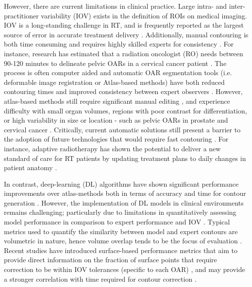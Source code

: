 However, there are current limitations in clinical practice. Large intra- and inter-practitioner variability (IOV) exists in the definition of ROIs on medical imaging. IOV is a long-standing challenge in RT, and is frequently reported as the largest source of error in accurate treatment delivery \cite{Vinod_2016}.
Additionally, manual contouring is both time consuming and requires highly skilled experts for consistency \cite{Nikolov_2018}. For instance, research has estimated that a radiation oncologist (RO) needs between 90-120 minutes to delineate pelvic OARs in a cervical cancer patient \cite{Liu_2020}. The process is often computer aided and automatic OAR segmentation tools (i.e. deformable image registration or Atlas-based methods) have both reduced contouring times and improved consistency between expert observers \cite{Vinod_2016}. However, atlas-based methods still require significant manual editing \cite{Nikolov_2018}, and experience difficulty with small organ volumes, regions with poor contrast for differentiation, or high variability in size or location - such as pelvic OARs in prostate and cervical cancer \cite{Schreier_2020, Liu_2020}. Critically, current automatic solutions still present a barrier to the adoption of future technologies that would require fast contouring \cite{Nikolov_2018}. For instance, adaptive radiotherapy has shown the potential to deliver a new standard of care for RT patients by updating treatment plans to daily changes in patient anatomy \cite{Nikolov_2018}. 

In contrast, deep-learning (DL) algorithms have shown significant performance improvements over atlas-methods both in terms of accuracy and time for contour generation \cite{CITATION}. However, the implementation of DL models in clinical environments remains challenging; particularly due to limitations in quantitatively assessing model performance in comparison to expert performance and IOV \cite{Nikolov_2018}. Typical metrics used to quantify the similarity between model and expert contours are volumetric in nature, hence volume overlap tends to be the focus of evaluation \cite{Nikolov_2018}. Recent studies have introduced surface-based performance metrics that aim to provide direct information on the fraction of surface points that require correction to be within IOV tolerances (specific to each OAR) \cite{Nikolov_2018, Vaassen_2020}, and may provide a stronger correlation with time required for contour correction \cite{Vaassen_2020}.

